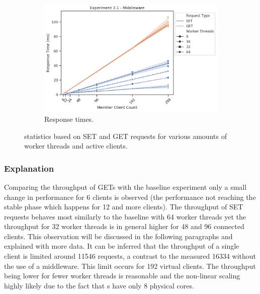 \begin{figure}
{\begin{subfigure}[t!]{0.55\textwidth}
                    \includegraphics[width=1\textwidth]{../data_analysis/figures/3-1_mw_response_time.png}
                    \caption{Response times.\label{fig:single_mw_rt}}
                \end{subfigure}
            }
            \caption{\mw{} statistics based on SET and GET requests for various amounts of worker threads and active
                     clients.\label{fig:single_mw_all}}
        \end{figure}

        \subsubsection{Explanation\label{subsubsec:3_one-middleware_summary}}

            Comparing the throughput of GETs with the baseline experiment only a small change in performance for 6
            clients is observed (the performance not reaching the stable phase which happens for 12 and more clients).
            The throughput of SET requests behaves most similarly to the baseline with 64 worker threads yet the
            throughput for 32 worker threads is in general higher for 48 and 96 connected clients. This observation will
            be discussed in the following paragraphs and explained with more data. It can be inferred that the
            throughput of a single client is limited around 11546 requests, a contrast to the measured 16334 without the
            use of a middleware. This limit occurs for 192 virtual clients. The throughput being lower for fewer worker
            threads is reasonable and the non-linear scaling highly likely due to the fact that \mw{}s have only 8
            physical cores.

